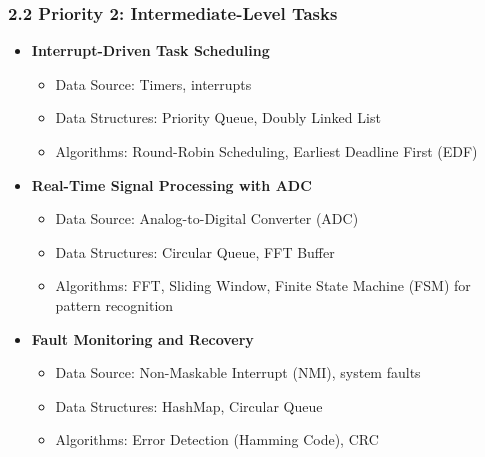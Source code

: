 \documentclass{article}
\begin{document}
\subsubsection*{2.2 Priority 2: Intermediate-Level Tasks}
\begin{itemize}
    \item \textbf{Interrupt-Driven Task Scheduling}
    \begin{itemize}
        \item Data Source: Timers, interrupts
        \item Data Structures: Priority Queue, Doubly Linked List
        \item Algorithms: Round-Robin Scheduling, Earliest Deadline First (EDF)
    \end{itemize}
    
    \item \textbf{Real-Time Signal Processing with ADC}
    \begin{itemize}
        \item Data Source: Analog-to-Digital Converter (ADC)
        \item Data Structures: Circular Queue, FFT Buffer
        \item Algorithms: FFT, Sliding Window, Finite State Machine (FSM) for pattern recognition
    \end{itemize}
    
    \item \textbf{Fault Monitoring and Recovery}
    \begin{itemize}
        \item Data Source: Non-Maskable Interrupt (NMI), system faults
        \item Data Structures: HashMap, Circular Queue
        \item Algorithms: Error Detection (Hamming Code), CRC
    \end{itemize}
\end{itemize}
\end{document}
